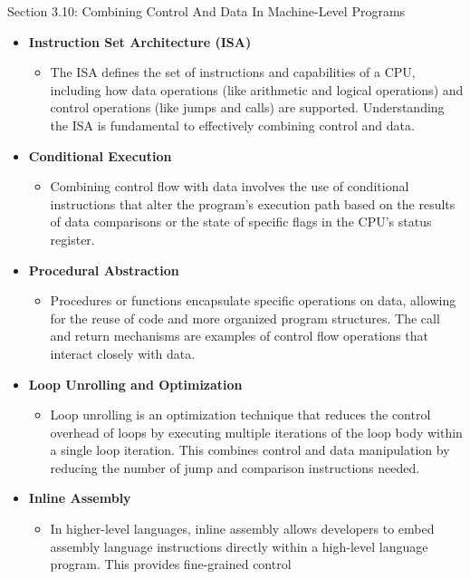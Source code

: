 \begin{notes}{Section 3.10: Combining Control And Data In Machine-Level Programs}
    \begin{itemize}
        \item \textbf{Instruction Set Architecture (ISA)}
        \begin{itemize}
            \item The ISA defines the set of instructions and capabilities of a CPU, including how data operations (like arithmetic and logical operations) and control operations (like jumps and calls) 
            are supported. Understanding the ISA is fundamental to effectively combining control and data.
        \end{itemize}
        \item \textbf{Conditional Execution}
        \begin{itemize}
            \item Combining control flow with data involves the use of conditional instructions that alter the program's execution path based on the results of data comparisons or the state of specific 
            flags in the CPU's status register.
        \end{itemize}
        \item \textbf{Procedural Abstraction}
        \begin{itemize}
            \item Procedures or functions encapsulate specific operations on data, allowing for the reuse of code and more organized program structures. The call and return mechanisms are examples of 
            control flow operations that interact closely with data.
        \end{itemize}
        \item \textbf{Loop Unrolling and Optimization}
        \begin{itemize}
            \item Loop unrolling is an optimization technique that reduces the control overhead of loops by executing multiple iterations of the loop body within a single loop iteration. This combines 
            control and data manipulation by reducing the number of jump and comparison instructions needed.
        \end{itemize}
        \item \textbf{Inline Assembly}
        \begin{itemize}
            \item In higher-level languages, inline assembly allows developers to embed assembly language instructions directly within a high-level language program. This provides fine-grained control 

\end{itemize}
\end{itemize}
\end{notes}

